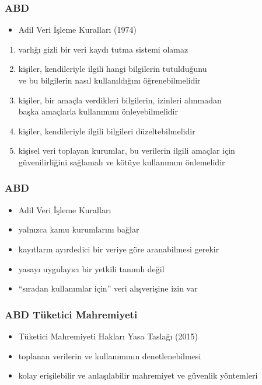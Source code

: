 \documentclass[dvipsnames]{beamer}
\theoremstyle{plain}
\begin{document}
\begin{frame}
  \frametitle{ABD}

  \begin{itemize}
   \item Adil Veri İşleme Kuralları (1974)
  \end{itemize}

  \begin{enumerate}
    \item varlığı gizli bir veri kaydı tutma sistemi olamaz
    \item kişiler, kendileriyle ilgili hangi bilgilerin tutulduğunu\\
      ve bu bilgilerin nasıl kullanıldığını öğrenebilmelidir
    \item kişiler, bir amaçla verdikleri bilgilerin, izinleri alınmadan\\
      başka amaçlarla kullanımını önleyebilmelidir
    \item kişiler, kendileriyle ilgili bilgileri düzeltebilmelidir
    \item kişisel veri toplayan kurumlar, bu verilerin ilgili amaçlar için\\
      güvenilirliğini sağlamalı ve kötüye kullanımını önlemelidir
  \end{enumerate}
\end{frame}

\begin{frame}
  \frametitle{ABD}

  \begin{itemize}
    \item Adil Veri İşleme Kuralları
    \smallskip
    \item yalnızca kamu kurumlarını bağlar
    \item kayıtların ayırdedici bir veriye göre aranabilmesi gerekir
    \item yasayı uygulayıcı bir yetkili tanımlı değil
    \item ``sıradan kullanımlar için'' veri alışverişine izin var
  \end{itemize}
\end{frame}

\begin{frame}
  \frametitle{ABD Tüketici Mahremiyeti}

  \begin{itemize}
    \item Tüketici Mahremiyeti Hakları Yasa Taslağı (2015)
    \smallskip
    \item toplanan verilerin ve kullanımının denetlenebilmesi
    \item kolay erişilebilir ve anlaşılabilir mahremiyet ve güvenlik yöntemleri
  \end{itemize}
\end{frame}
\end{document}
